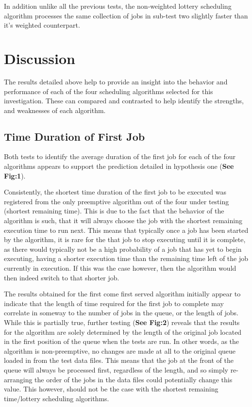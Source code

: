 \documentclass{acm_proc_article-sp}
\begin{document}
In addition unlike all the previous tests, the non-weighted lottery scheduling algorithm processes the same collection of jobs in sub-test two slightly faster than it's weighted counterpart. 

\section{Discussion}

The results detailed above help to provide an insight into the behavior and performance of each of the four scheduling algorithms selected for this investigation. These can compared and contrasted to help identify the strengths, and weaknesses of each algorithm. 

\vfill
\subsection{Time Duration of First Job}

Both tests to identify the average duration of the first job for each of the four algorithms appears to support the prediction detailed in hypothesis one (\textbf{See Fig:1}). 

Consistently, the shortest time duration of the first job to be executed was registered from the only preemptive algorithm out of the four under testing (shortest remaining time). This is due to the fact that the behavior of the algorithm is such, that it will always choose the job with the shortest remaining execution time to run next. This means that typically once a job has been started by the algorithm, it is rare for the that job to stop executing until it is complete, as there would typically not be a high probability of a job that has yet to begin executing, having a shorter execution time than the remaining time left of the job currently in execution. If this was the case however, then the algorithm would then indeed switch to that shorter job. 

The results obtained for the first come first served algorithm initially appear to indicate that the length of time required for the first job to complete may correlate in someway to the number of jobs in the queue, or the length of jobs. While this is partially true,  further testing (\textbf{See Fig:2}) reveals that the results for the algorithm are solely determined by the length of the original job located in the first position of the queue when the tests are run. In other words, as the algorithm is non-preemptive, no changes are made at all to the original queue loaded in from the test data files. This means that the job at the front of the queue will always be processed first, regardless of the length, and so simply re-arranging the order of the jobs in the data files could potentially change this value. This however, should not be the case with the shortest remaining time/lottery scheduling algorithms.
\end{document}

